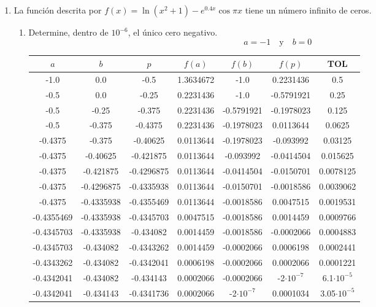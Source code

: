 \documentclass[12pt]{article}
\begin{document}
\begin{enumerate}
    \item La función descrita por \( f(x) = \ln(x^2 + 1) - e^{0.4x} \cos \pi x \) tiene un número infinito de ceros.
    \begin{enumerate}
        \item Determine, dentro de \(10^{-6}\), el único cero negativo.
            \[a = -1 \quad \text{y} \quad b = 0\]
            \begin{center}
            \begin{tabular}{|c|c|c|c|c|c|c|}
            \hline
            \(a\) & \(b\)& \(p\)&\(f(a)\) & \(f(b)\) & \(f(p)\)&\textbf{TOL} \\
            \hline
            -1.0 & 0.0 & -0.5 & 1.3634672 & -1.0 & 0.2231436 & 0.5 \\
            -0.5 & 0.0 & -0.25 & 0.2231436 & -1.0 & -0.5791921 & 0.25 \\
            -0.5 & -0.25 & -0.375 & 0.2231436 & -0.5791921 & -0.1978023 & 0.125 \\
            -0.5 & -0.375 & -0.4375 & 0.2231436 & -0.1978023 & 0.0113644 & 0.0625 \\
            -0.4375 & -0.375 & -0.40625 & 0.0113644 & -0.1978023 & -0.093992 & 0.03125 \\
            -0.4375 & -0.40625 & -0.421875 & 0.0113644 & -0.093992 & -0.0414504 & 0.015625 \\
            -0.4375 & -0.421875 & -0.4296875 & 0.0113644 & -0.0414504 & -0.0150701 & 0.0078125 \\
            -0.4375 & -0.4296875 & -0.4335938 & 0.0113644 & -0.0150701 & -0.0018586 & 0.0039062 \\
            -0.4375 & -0.4335938 & -0.4355469 & 0.0113644 & -0.0018586 & 0.0047515 & 0.0019531 \\
            -0.4355469 & -0.4335938 & -0.4345703 & 0.0047515 & -0.0018586 & 0.0014459 & 0.0009766 \\
            -0.4345703 & -0.4335938 & -0.434082 & 0.0014459 & -0.0018586 & -0.0002066 & 0.0004883 \\
            -0.4345703 & -0.434082 & -0.4343262 & 0.0014459 & -0.0002066 & 0.0006198 & 0.0002441 \\
            -0.4343262 & -0.434082 & -0.4342041 & 0.0006198 & -0.0002066 & 0.0002066 & 0.0001221 \\
            -0.4342041 & -0.434082 & -0.434143 & 0.0002066 & -0.0002066 & -2\(\cdot 10^{-7}\) & 6.1\(\cdot 10^{-5}\) \\
            -0.4342041 & -0.434143 & -0.4341736 & 0.0002066 & -2\(\cdot 10^{-7}\) & 0.0001034 & 3.05\(\cdot 10^{-5}\) \\

\end{tabular}
\end{center}
\end{enumerate}
\end{enumerate}
\end{document}
